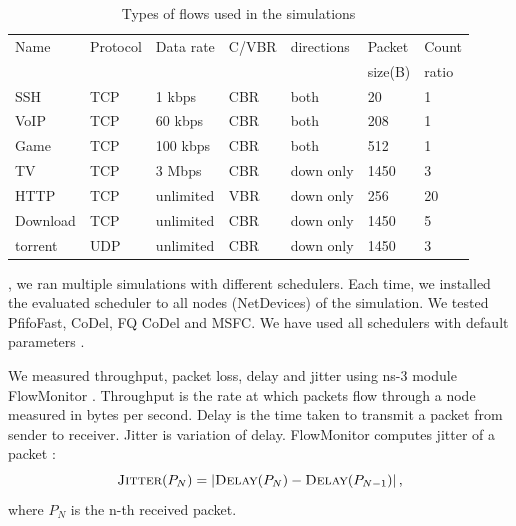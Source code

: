 \begin{table}
	\centering
	
	\begin{tabular}{@{}lllllll@{}}
		\toprule
		Name     & Protocol & Data rate & C/VBR & directions & Packet  & Count \\
		         &          &           &       &            & size(B) & ratio \\ \midrule
		SSH      & TCP      & 1 kbps    & CBR   & both       & 20      & 1     \\
		VoIP     & TCP      & 60 kbps   & CBR   & both       & 208     & 1     \\
		Game     & TCP      & 100 kbps  & CBR   & both       & 512     & 1     \\
		TV       & TCP      & 3 Mbps    & CBR   & down only  & 1450    & 3     \\
		HTTP     & TCP      & unlimited & VBR   & down only  & 256     & 20    \\
		Download & TCP      & unlimited & CBR   & down only  & 1450    & 5     \\
		torrent  & UDP      & unlimited & CBR   & down only  & 1450    & 3     \\ \bottomrule
	\end{tabular}
	\caption{Types of flows used in the simulations}
	\label{tab:traffic}
\end{table}

 , we ran multiple simulations with different schedulers. Each time, we installed the evaluated scheduler to all nodes (NetDevices) of the simulation. We tested PfifoFast, CoDel, FQ CoDel and MSFC. We have used all schedulers with default parameters .

We measured throughput, packet loss, delay and jitter using ns-3 module FlowMonitor \cite{flowMonitor}. Throughput is the rate at which packets flow through a node measured in bytes per second. Delay is the time taken to transmit a packet from sender to receiver. Jitter is  variation of delay. FlowMonitor computes  jitter of a packet  :
\[
	\textsc{Jitter}(P_N) = \left|{\textsc{Delay}(P_N) - \textsc{Delay}(P_{N-1})}\right|,
\]
where $P_N$ is the n-th received packet. 

